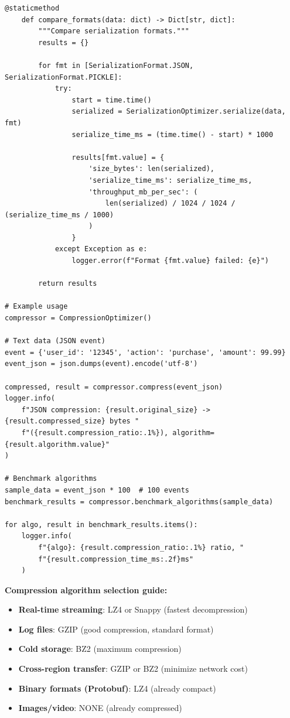\begin{lstlisting}[style=python, caption={Compression Optimizer for Data Types}]
    @staticmethod
    def compare_formats(data: dict) -> Dict[str, dict]:
        """Compare serialization formats."""
        results = {}

        for fmt in [SerializationFormat.JSON, SerializationFormat.PICKLE]:
            try:
                start = time.time()
                serialized = SerializationOptimizer.serialize(data, fmt)
                serialize_time_ms = (time.time() - start) * 1000

                results[fmt.value] = {
                    'size_bytes': len(serialized),
                    'serialize_time_ms': serialize_time_ms,
                    'throughput_mb_per_sec': (
                        len(serialized) / 1024 / 1024 / (serialize_time_ms / 1000)
                    )
                }
            except Exception as e:
                logger.error(f"Format {fmt.value} failed: {e}")

        return results

# Example usage
compressor = CompressionOptimizer()

# Text data (JSON event)
event = {'user_id': '12345', 'action': 'purchase', 'amount': 99.99}
event_json = json.dumps(event).encode('utf-8')

compressed, result = compressor.compress(event_json)
logger.info(
    f"JSON compression: {result.original_size} -> {result.compressed_size} bytes "
    f"({result.compression_ratio:.1%}), algorithm={result.algorithm.value}"
)

# Benchmark algorithms
sample_data = event_json * 100  # 100 events
benchmark_results = compressor.benchmark_algorithms(sample_data)

for algo, result in benchmark_results.items():
    logger.info(
        f"{algo}: {result.compression_ratio:.1%} ratio, "
        f"{result.compression_time_ms:.2f}ms"
    )
\end{lstlisting}

\textbf{Compression algorithm selection guide:}
\begin{itemize}
    \item \textbf{Real-time streaming}: LZ4 or Snappy (fastest decompression)
    \item \textbf{Log files}: GZIP (good compression, standard format)
    \item \textbf{Cold storage}: BZ2 (maximum compression)
    \item \textbf{Cross-region transfer}: GZIP or BZ2 (minimize network cost)
    \item \textbf{Binary formats (Protobuf)}: LZ4 (already compact)
    \item \textbf{Images/video}: NONE (already compressed)
\end{itemize}

